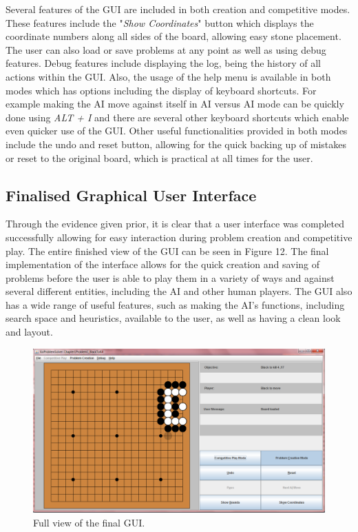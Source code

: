 \documentclass{l3proj}
\begin{document}
Several features of the GUI are included in both creation and competitive modes. These features include the "\textit{Show Coordinates}" button which displays the coordinate numbers along all sides of the board, allowing easy stone placement. The user can also load or save problems at any point as well as using debug features. Debug features include displaying the log, being the history of all actions within the GUI. Also, the usage of the help menu is available in both modes which has options including the display of keyboard shortcuts. For example making the AI move against itself in AI versus AI mode can be quickly done using \textit{ALT + I} and there are several other keyboard shortcuts which enable even quicker use of the GUI. Other useful functionalities provided in both modes include the undo and reset button, allowing for the quick backing up of mistakes or reset to the original board, which is practical at all times for the user.

\subsection{Finalised Graphical User Interface}

Through the evidence given prior, it is clear that a user interface was completed successfully allowing for easy interaction during problem creation and competitive play. The entire finished view of the GUI can be seen in Figure 12. The final implementation of the interface allows for the quick creation and saving of problems before the user is able to play them in a variety of ways and against several different entities, including the AI and other human players. The GUI also has a wide range of useful features, such as making the AI's functions, including search space and heuristics, available to the user, as well as having a clean look and layout.

\begin{figure}[H]
\centering
\includegraphics[scale=0.5]{Images/GUI-13-FullView.png}
\caption{Full view of the final GUI.}
\end{figure}
\end{document}
